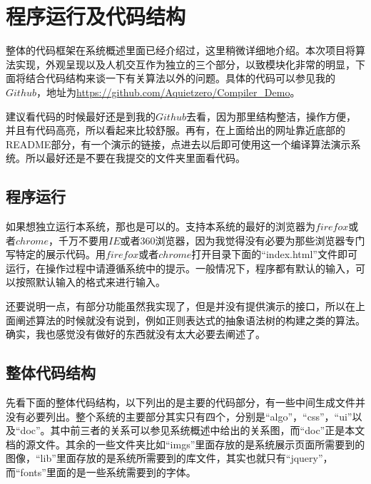 \chapter{程序运行及代码结构}

整体的代码框架在系统概述里面已经介绍过，这里稍微详细地介绍。本次项目将算法实现，外观呈现以及人机交互作为独立的三个部分，以致模块化非常的明显，下面将结合代码结构来谈一下有关算法以外的问题。具体的代码可以参见我的$Github$，地址为\url{https://github.com/Aquietzero/Compiler_Demo}。

建议看代码的时候最好还是到我的$Github$去看，因为那里结构整洁，操作方便，并且有代码高亮，所以看起来比较舒服。再有，在上面给出的网址靠近底部的README部分，有一个演示的链接，点进去以后即可使用这一个编译算法演示系统。所以最好还是不要在我提交的文件夹里面看代码。

\section{程序运行}

如果想独立运行本系统，那也是可以的。支持本系统的最好的浏览器为$firefox$或者$chrome$，千万不要用$IE$或者$360$浏览器，因为我觉得没有必要为那些浏览器专门写特定的展示代码。用$firefox$或者$chrome$打开目录下面的“index.html”文件即可运行，在操作过程中请遵循系统中的提示。一般情况下，程序都有默认的输入，可以按照默认输入的格式来进行输入。

还要说明一点，有部分功能虽然我实现了，但是并没有提供演示的接口，所以在上面阐述算法的时候就没有说到，例如正则表达式的抽象语法树的构建之类的算法。确实，我也感觉没有做好的东西就没有太大必要去阐述了。

\section{整体代码结构}

先看下面的整体代码结构，以下列出的是主要的代码部分，有一些中间生成文件并没有必要列出。整个系统的主要部分其实只有四个，分别是“algo”，“css”，“ui”以及“doc”。其中前三者的关系可以参见系统概述中给出的关系图，而“doc”正是本文档的源文件。其余的一些文件夹比如“imgs”里面存放的是系统展示页面所需要到的图像，“lib”里面存放的是系统所需要到的库文件，其实也就只有“jquery”，而“fonts”里面的是一些系统需要到的字体。

